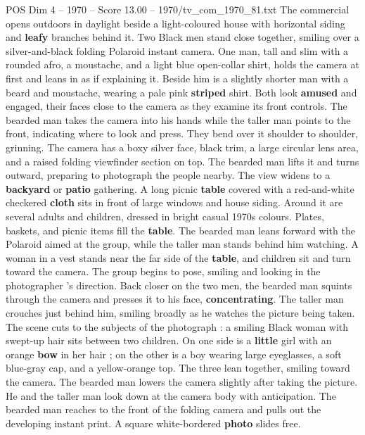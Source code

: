 \begin{textsample}{POS Dim 4 – 1970 – Score 13.00 – 1970/tv\_com\_1970\_81.txt}  \label{ex:f4_pos_087}
The commercial opens outdoors in daylight beside a light-coloured house with horizontal siding and \textbf{leafy} branches behind it.
Two Black men stand close together, smiling over a silver-and-black folding Polaroid instant camera.
One man, tall and slim with a rounded afro, a moustache, and a light blue open-collar shirt, holds the camera at first and leans in as if explaining it.
Beside him is a slightly shorter man with a beard and moustache, wearing a pale pink \textbf{striped} shirt.
Both look \textbf{amused} and engaged, their faces close to the camera as they examine its front controls.
The bearded man takes the camera into his hands while the taller man points to the front, indicating where to look and press.
They bend over it shoulder to shoulder, grinning.
The camera has a boxy silver face, black trim, a large circular lens area, and a raised folding viewfinder section on top.
The bearded man lifts it and turns outward, preparing to photograph the people nearby.
The view widens to a \textbf{backyard} or \textbf{patio} gathering.
A long picnic \textbf{table} covered with a red-and-white checkered \textbf{cloth} sits in front of large windows and house siding.
Around it are several adults and children, dressed in bright casual 1970s colours.
Plates, baskets, and picnic items fill the \textbf{table}.
The bearded man leans forward with the Polaroid aimed at the group, while the taller man stands behind him watching.
A woman in a vest stands near the far side of the \textbf{table}, and children sit and turn toward the camera.
The group begins to pose, smiling and looking in the photographer ’s direction.
Back closer on the two men, the bearded man squints through the camera and presses it to his face, \textbf{concentrating}.
The taller man crouches just behind him, smiling broadly as he watches the picture being taken.
The scene cuts to the subjects of the photograph : a smiling Black woman with swept-up hair sits between two children.
On one side is a \textbf{little} girl with an orange \textbf{bow} in her hair ; on the other is a boy wearing large eyeglasses, a soft blue-gray cap, and a yellow-orange top.
The three lean together, smiling toward the camera.
The bearded man lowers the camera slightly after taking the picture.
He and the taller man look down at the camera body with anticipation.
The bearded man reaches to the front of the folding camera and pulls out the developing instant print.
A square white-bordered \textbf{photo} slides free.

\end{textsample}
